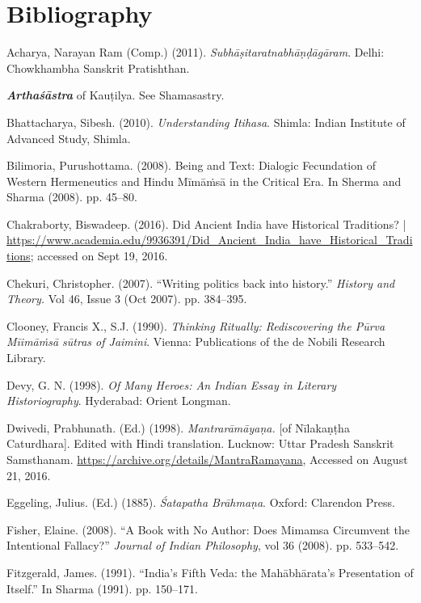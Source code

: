 \section*{Bibliography}

\begin{thebibliography}{99}
 Acharya, Narayan Ram (Comp.) (2011). \textit{Subhāṣitaratnabhāṇḍāgāram}. Delhi: Chowkhambha Sanskrit Pratishthan.

  \textbf{\textit{Arthaśāstra}} of Kauṭilya. See Shamasastry.

  Bhattacharya, Sibesh. (2010). \textit{Understanding Itihasa}. Shimla: Indian Institute of Advanced Study, Shimla.

  Bilimoria, Purushottama. (2008). Being and Text: Dialogic Fecundation of Western Hermeneutics and Hindu Mīmāṁsā in the Critical Era. In Sherma and Sharma (2008). pp. 45–80.

  Chakraborty, Biswadeep. (2016). Did Ancient India have Historical Traditions? | \url{https://www.academia.edu/9936391/Did_Ancient_India_have_Historical_Traditions}; accessed on Sept 19, 2016.

  Chekuri, Christopher. (2007). “Writing politics back into history.” \textit{History and Theory.} Vol 46, Issue 3 (Oct 2007). pp. 384–395.

  Clooney, Francis X., S.J. (1990). \textit{Thinking Ritually: Rediscovering the Pūrva Mīimāṁsā sūtras of Jaimini}. Vienna: Publications of the de Nobili Research Library.

  Devy, G. N. (1998). \textit{Of Many Heroes: An Indian Essay in Literary Historiography}. Hyderabad: Orient Longman.

  Dwivedi, Prabhunath. (Ed.) (1998). \textit{Mantrarāmāyaṇa.} [of Nīlakaṇṭha Caturdhara]. Edited with Hindi translation. Lucknow: Uttar Pradesh Sanskrit Samsthanam. \url{https://archive.org/details/MantraRamayana}, Accessed on August 21, 2016.

  Eggeling, Julius. (Ed.) (1885). \textit{Śatapatha Brāhmaṇa}. Oxford: Clarendon Press.

  Fisher, Elaine. (2008). “A Book with No Author: Does Mimamsa Circumvent the Intentional Fallacy?” \textit{Journal of Indian Philosophy}, vol 36 (2008). pp. 533–542.

  Fitzgerald, James. (1991). “India’s Fifth Veda: the Mahābhārata’s Presentation of Itself.” In Sharma (1991). pp. 150–171.


\end{thebibliography}
